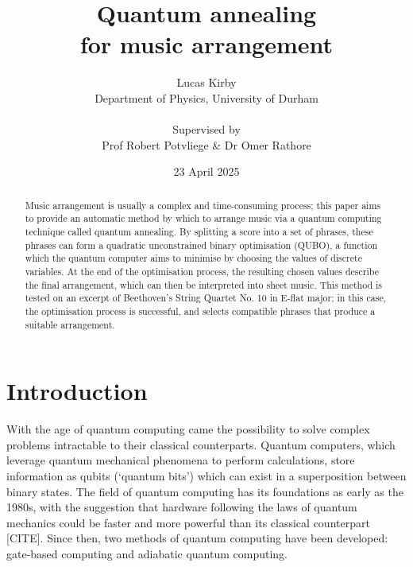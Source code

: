\documentclass[12pt]{article}
\title{\Huge \bfseries Quantum annealing\\for music arrangement}
\author{Lucas Kirby\\\normalsize Department of Physics, University of Durham\\\\\normalsize Supervised by\\\normalsize Prof Robert Potvliege \& Dr Omer Rathore}
\date{\normalsize 23 April 2025}
\theoremstyle{definition}
\begin{document}
\maketitle

\vfill

\begin{abstract}              

Music arrangement is usually a complex and time-consuming process; this paper aims to provide an automatic method by which to arrange music via a quantum computing technique called quantum annealing. By splitting a score into a set of phrases, these phrases can form a quadratic unconstrained binary optimisation (QUBO), a function which the quantum computer aims to minimise by choosing the values of discrete variables. At the end of the optimisation process, the resulting chosen values describe the final arrangement, which can then be interpreted into sheet music. This method is tested on an excerpt of Beethoven's String Quartet No. 10 in E-flat major; in this case, the optimisation process is successful, and selects compatible phrases that produce a suitable arrangement.

\end{abstract}

\vfill

\begin{center}
    
\end{center}

\thispagestyle{empty}
\clearpage

\tableofcontents
\listoffigures

\thispagestyle{empty}
\clearpage

\section{Introduction}

With the age of quantum computing came the possibility to solve complex problems intractable to their classical counterparts. Quantum computers, which leverage quantum mechanical phenomena to perform calculations, store information as qubits (`quantum bits') which can exist in a superposition between binary states.
The field of quantum computing has its foundations as early as the 1980s, with the suggestion that hardware following the laws of quantum mechanics could be faster and more powerful than its classical counterpart [CITE]. Since then, two methods of quantum computing have been developed: gate-based computing and adiabatic quantum computing.
\end{document}
